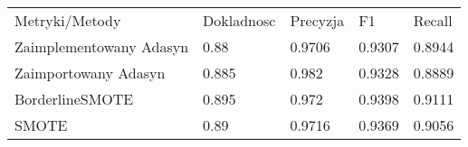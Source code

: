 \begin{tabular}{lllll}
\hline
 Metryki/Metody          & Dokladnosc & Precyzja & F1     & Recall \\
 Zaimplementowany Adasyn & 0.88       & 0.9706   & 0.9307 & 0.8944 \\
 Zaimportowany Adasyn    & 0.885      & 0.982    & 0.9328 & 0.8889 \\
 BorderlineSMOTE         & 0.895      & 0.972    & 0.9398 & 0.9111 \\
 SMOTE                   & 0.89       & 0.9716   & 0.9369 & 0.9056 \\
\hline
\end{tabular}
